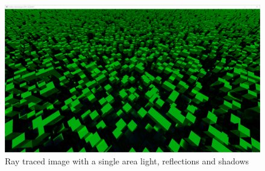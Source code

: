 \documentclass[times, utf8, zavrsni, numeric]{fer}
\begin{document}
\begin{center}
\begin{figure}[H]
\includegraphics[width=1\textwidth]{ray_trace.png}
\caption{Ray traced image with a single area light, reflections and shadows}
\label{image:ray_traced}
\end{figure}
\end{center}
\end{document}
